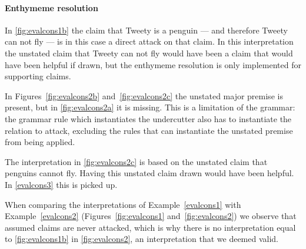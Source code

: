 \paragraph{Enthymeme resolution}
In \autoref{fig:evalcons1b} the claim that Tweety is a penguin --- and therefore Tweety can not fly --- is in this case a direct attack on that claim. In this interpretation the unstated claim that Tweety can not fly would have been a claim that would have been helpful if drawn, but the enthymeme resolution is only implemented for supporting claims.

In Figures~\ref{fig:evalcons2b} and~\ref{fig:evalcons2c} the unstated major premise is present, but in \autoref{fig:evalcons2a} it is missing. This is a limitation of the grammar: the grammar rule which instantiates the undercutter also has to instantiate the relation to attack, excluding the rules that can instantiate the unstated premise from being applied.

The interpretation in \autoref{fig:evalcons2c} is based on the unstated claim that penguins cannot fly. Having this unstated claim drawn would have been helpful. In \autoref{evalcons3} this is picked up.

When comparing the interpretations of Example~\ref{evalcons1} with Example~\ref{evalcons2} (Figures~\ref{fig:evalcons1} and~\ref{fig:evalcons2}) we observe that assumed claims are never attacked, which is why there is no interpretation equal to \autoref{fig:evalcons1b} in \autoref{fig:evalcons2}, an interpretation that we deemed valid.
 
